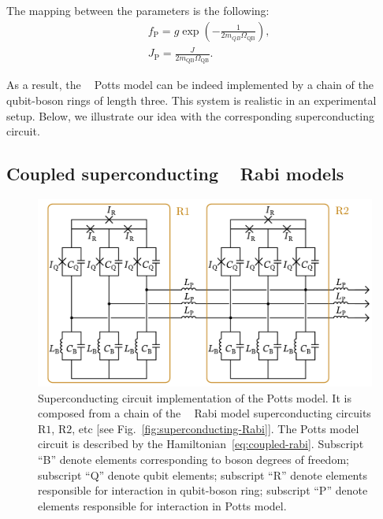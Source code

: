 \documentclass[reprint, aps, prx, amsmath, amssymb, longbibliography, superscriptaddress]{revtex4-2}
\DeclareMathOperator{\Zthree}{\mathbb{Z}_3}
\begin{document}
The mapping between the parameters is the following:
\begin{equation}
\begin{aligned}
    &f_{\text{P}} = g \exp\left(-\frac{1}{2 m_{QB} \Omega_{\text{QB}}}\right),\\
    &J_{\text{P}} = \frac{J }{2 m_{\text{QB}} \Omega_{\text{QB}}} .
\end{aligned}
\end{equation}

As a result, the $\Zthree$ Potts model can be indeed implemented by a chain of the qubit-boson rings of length three. This system is realistic in an experimental setup. Below, we illustrate our idea with the corresponding superconducting circuit.

\subsection{Coupled superconducting \texorpdfstring{$\Zthree$}{Z3} Rabi models}


\begin{figure}[t]
    \includegraphics[width=\linewidth]{pics/SC_Potts_circuit_with_contours.pdf}
    \caption{Superconducting circuit implementation of the Potts model. It is composed from a chain of the $\Zthree$ Rabi model superconducting circuits $\mathrm{R1}$, $\mathrm{R2}$, etc [see Fig.~\ref{fig:superconducting-Rabi}]. The Potts model circuit is described by the Hamiltonian~\eqref{eq:coupled-rabi}. Subscript ``B'' denote elements corresponding to boson degrees of freedom; subscript ``Q'' denote qubit elements; subscript ``R'' denote elements responsible for interaction in qubit-boson ring; subscript ``P'' denote elements responsible for interaction in Potts model.}
    \label{fig:superconducting-potts}
\end{figure}
\end{document}
